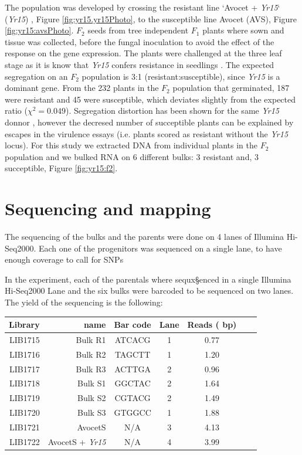 The population was developed by crossing the resistant line `Avocet + \textit{Yr15}` (\textit{Yr15}) \citep{Wellings1998}, Figure \ref{fig:yr15.yr15Photo}, to the susceptible line Avocet (AVS), Figure \ref{fig:yr15:avsPhoto}. 
$F_{2}$ seeds from tree independent $F_{1}$ plants where sown and tissue was collected, before the fungal inoculation to avoid the effect of the response on the gene expression.  
The plants were challenged at the three leaf stage as it is know that \textit{Yr15} confers resistance in seedlings \citep{Gerechter-Amitai1989}.
The expected segregation on an $F_{2}$ population is 3:1 (resistant:susceptible), since \textit{Yr15} is a dominant gene.
From the 232 plants in the $F_{2}$ population that germinated, 187 were resistant and 45 were susceptible, which deviates slightly from the expected ratio ($\chi^{2}=0.049$).
Segregation distortion has been shown for the same \textit{Yr15} donnor \citep{Randhawa2009}, however the decresed number of succeptible plants can be explained by escapes in the virulence essays (i.e. plants scored as resistant without the \textit{Yr15} locus).   For this study we extracted DNA from individual plants in the $F_{2}$ population and we bulked RNA on 6 different bulks: 3 resistant and, 3 succeptible, Figure \ref{fig:yr15:f2}. 

\section{Sequencing and mapping} 
The sequencing of the bulks and the parents were done on 4 lanes of Illumina Hi-Seq2000. 
Each one of the progenitors was sequenced on a single lane, to have enough coverage to call for SNPs


In the experiment, each of the parentals where sequx§enced in a single Illumina Hi-Seq2000 Lane and the six bulks were barcoded to be sequenced on two lanes. The yield of the sequencing is the following: 

\begin{center}
\begin{tabular}{rrccccc}
\toprule
Library & name & Bar code & Lane   &  Reads (\e{8} bp)\\ 
\midrule
LIB1715 & Bulk R1& ATCACG & 1 	& 0.77\\
LIB1716 & Bulk R2& TAGCTT & 1 		& 1.20\\
LIB1717 & Bulk R3& ACTTGA & 2 	& 0.96  \\ 
LIB1718 & Bulk S1& GGCTAC & 2 	& 1.64   \\ 
LIB1719 & Bulk S2 & CGTACG & 2 	& 1.49  \\ 
LIB1720 & Bulk S3 & GTGGCC & 1 	&1.88  \\ 
LIB1721 & AvocetS & N/A & 3 		& 4.13 \\ 
LIB1722 & AvocetS + \textit{Yr15} & N/A & 4 	& 3.99  \\ 

\bottomrule
\end{tabular}
\end{center}



